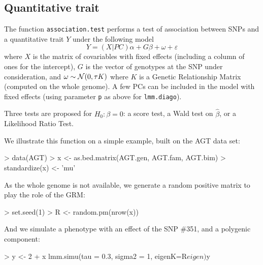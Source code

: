 \documentclass{article}
\renewenvironment{Schunk}{\vspace{\topsep}}{\vspace{\topsep}}
\begin{document}
\subsection{Quantitative trait}

  The function \verb!association.test! performs a test of association between SNPs 
  and a quantitative trait $Y$ under the following model
\begin{equation*}
  Y = (X|PC)\alpha + G\beta + \omega + \varepsilon 
\end{equation*}
  where $X$ is the matrix of covariables with fixed effects (including a column 
  of ones for the intercept), $G$ is the vector of genotypes at the SNP under
  consideration, and $\omega\sim\mathcal{N}(0,\tau K)$ where $K$ is a Genetic Relationship
  Matrix (computed on the whole genome). A few PCs can be included in the model
  with fixed effects (using parameter \verb!p! as above for \verb!lmm.diago!).

  Three tests are proposed for $H_0: \beta = 0$: a score test, a Wald test on $\widehat\beta$,
  or a Likelihood Ratio Test.

  We illustrate this function on a simple example, built on the AGT data set:
\begin{Schunk}
\begin{Sinput}
> data(AGT)
> x <- as.bed.matrix(AGT.gen, AGT.fam, AGT.bim)
> standardize(x) <- 'mu'
\end{Sinput}
\end{Schunk}

  As the whole genome is not available, we generate a random positive matrix to play the role of the GRM:
\begin{Schunk}
\begin{Sinput}
> set.seed(1)
> R <- random.pm(nrow(x))
\end{Sinput}
\end{Schunk}

  And we simulate a phenotype with an effect of the SNP \#351, and a polygenic component:
\begin{Schunk}
\begin{Sinput}
> y <- 2 + x %
      lmm.simu(tau = 0.3, sigma2 = 1, eigenK=R$eigen)$y
\end{Sinput}
\end{Schunk}
\end{document}
